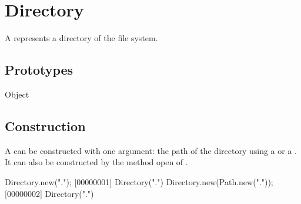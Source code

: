 
\section{Directory}

A  represents a directory of the file system.

\subsection{Prototypes}
\begin{refObjects}
\item[Object]
\end{refObjects}

\subsection{Construction}

A  can be constructed with one argument: the path of
the directory using a  or a . It can
also be constructed by the method open of .

\begin{urbiscript}[firstnumber=1]
Directory.new(".");
[00000001] Directory(".")
Directory.new(Path.new("."));
[00000002] Directory(".")
\end{urbiscript}

